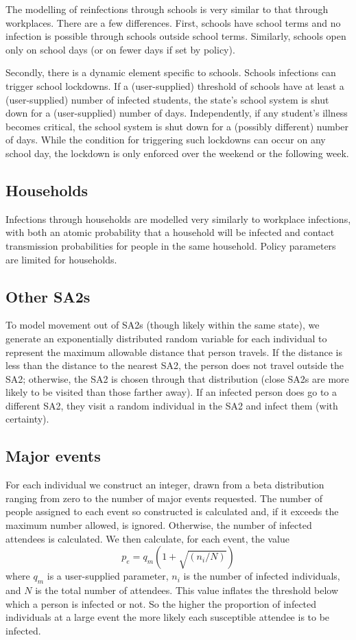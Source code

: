 \documentclass[submission]{grattan}
\begin{document}
The modelling of reinfections through schools is very similar to that through workplaces.
There are a few differences.
First, schools have school terms and no infection is possible through schools outside school terms.
Similarly, schools open only on school days (or on fewer days if set by policy).

Secondly, there is a dynamic element specific to schools. Schools infections can trigger school
lockdowns. If a (user-supplied) threshold of schools have at least a (user-supplied) number of
infected students, the state's school system is shut down for a (user-supplied) number of days.
Independently, if any student's illness becomes critical, the school system is shut down for
a (possibly different) number of days.  While the condition for triggering such lockdowns can occur
on any school day, the lockdown is only enforced over the weekend or the following week.

\subsection{Households}

Infections through households are modelled very similarly to workplace infections,
with both an atomic probability that a household will be infected and contact
transmission probabilities for people in the same household.
Policy parameters are limited for households.

\subsection{Other SA2s}

To model movement out of SA2s (though likely within the same state),
we generate an exponentially distributed random variable
for each individual to represent the maximum allowable distance that person
travels. If the distance is less than the distance to the nearest SA2, the person
does not travel outside the SA2; otherwise, the SA2 is chosen through that distribution
(close SA2s are more likely to be visited than those farther away).
 If an infected person does go to a different SA2, they visit a random individual in the SA2 and
 infect them (with certainty).

\subsection{Major events}
For each individual we construct an integer, drawn from a beta distribution ranging from zero
to the number of major events requested. The number of people assigned to each event so constructed
is calculated and, if it exceeds the maximum number allowed, is ignored. Otherwise, the number of
infected attendees is calculated. We then calculate, for each event, the value
\[p_e = q_m(1 + \sqrt{(n_i / N)}) \]
where \(q_m\) is a user-supplied parameter, \(n_i\) is the number of infected individuals, and \(N\)
is the total number of attendees. This value inflates the threshold below which a person is infected
or not. So the higher the proportion of infected individuals at a large event the more likely each
susceptible attendee is to be infected.
\end{document}
